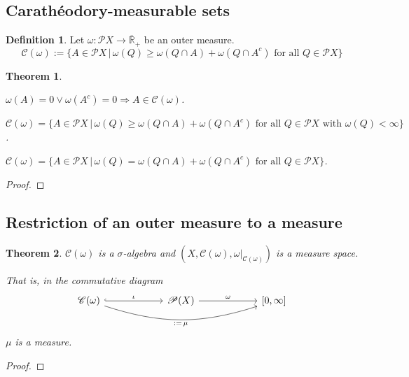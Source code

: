 \documentclass[11pt, a4paper, openany]{book}
\newtheorem{thm}{Theorem}\newtheorem{lem}{Lemma}\newtheorem{crl}{Corollary}
\theoremstyle{definition}
\newtheorem{define}{Definition}\newtheorem{exam}{Example}\newtheorem{remark}{Remark}
\newenvironment{tight_enumerate}{\begin{enumerate}\itemsep -0.2em}{\end{enumerate}}
\begin{document}
\subsection{Carath\'{e}odory-measurable sets}
    \begin{define}
        Let $\omega:\mathscr{P}X\rightarrow \overline{\mathbb{R}}_+$ be an outer measure.
        \[\mathscr{C}(\omega):=\{A\in\mathscr{P}X\,|\,\omega(Q)\geqslant\omega(Q\cap A)+\omega (Q\cap A^c)\text{ for all }Q\in\mathscr{P}X\}\]
    \end{define}
    \begin{thm}
        \begin{tight_enumerate}
            \item $\omega(A)=0\vee \omega(A^c)=0\Longrightarrow A\in \mathscr{C}(\omega)$.
            \item $\mathscr{C}(\omega)=\{A\in\mathscr{P}X\,|\,\omega(Q)\geqslant\omega(Q\cap A)+\omega (Q\cap A^c)\text{ for all }Q\in\mathscr{P}X\text{ with }\omega(Q)<\infty\}$.
            \item $\mathscr{C}(\omega)=\{A\in\mathscr{P}X\,|\,\omega(Q)=\omega(Q\cap A)+\omega (Q\cap A^c)\text{ for all }Q\in\mathscr{P}X\}$.
        \end{tight_enumerate}
    \end{thm}
    \begin{proof}
        
    \end{proof}
\subsection{Restriction of an outer measure to a measure}
    \begin{thm}
        $\mathscr{C}(\omega)$ is a $\sigma$-algebra and $(X,\mathscr{C}(\omega),\omega|_{\mathscr{C}(\omega)})$ is a measure space. 
        
        That is, in the commutative diagram
        \[
            \begin{tikzcd}[column sep = 60pt]
                \mathscr{C}(\omega) \ar[r, "\iota", hook] \ar[rr, ":=\,\mu"', bend right=18] & \mathscr{P}(X) \ar[r, "\omega"] & {[0,\infty]}
            \end{tikzcd}
        \]
        $\mu$ is a measure.
    \end{thm}
    \begin{proof}
        
    \end{proof}
\end{document}
